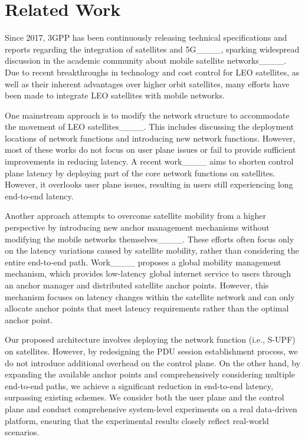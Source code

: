 \section{Related Work}
\vspace{-0.5ex}
Since 2017, 3GPP has been continuously releasing technical specifications and reports regarding the integration of satellites and 5G____, sparking widespread discussion in the academic community about mobile satellite networks____. Due to recent breakthroughs in technology and cost control for LEO satellites, as well as their inherent advantages over higher orbit satellites, many efforts have been made to integrate LEO satellites with mobile networks.

One mainstream approach is to modify the network structure to accommodate the movement of LEO satellites____. This includes discussing the deployment locations of network functions and introducing new network functions. However, most of these works do not focus on user plane issues or fail to provide sufficient improvements in reducing latency.
A recent work____ aims to shorten control plane latency by deploying part of the core network functions on satellites. However, it overlooks user plane issues, resulting in users still experiencing long end-to-end latency. 

Another approach attempts to overcome satellite mobility from a higher perspective by introducing new anchor management mechanisms without modifying the mobile networks themselves____. These efforts often focus only on the latency variations caused by satellite mobility, rather than considering the entire end-to-end path. Work____ proposes a global mobility management mechanism, which provides low-latency global internet service to users through an anchor manager and distributed satellite anchor points. However, this mechanism focuses on latency changes within the satellite network and can only allocate anchor points that meet latency requirements rather than the optimal anchor point.

Our proposed architecture involves deploying the network function (i.e., S-UPF) on satellites. However, by redesigning the PDU session establishment process, we do not introduce additional overhead on the control plane. On the other hand, by expanding the available anchor points and comprehensively considering multiple end-to-end paths, we achieve a significant reduction in end-to-end latency, surpassing existing schemes. We consider both the user plane and the control plane and conduct comprehensive system-level experiments on a real data-driven platform, ensuring that the experimental results closely reflect real-world scenarios.